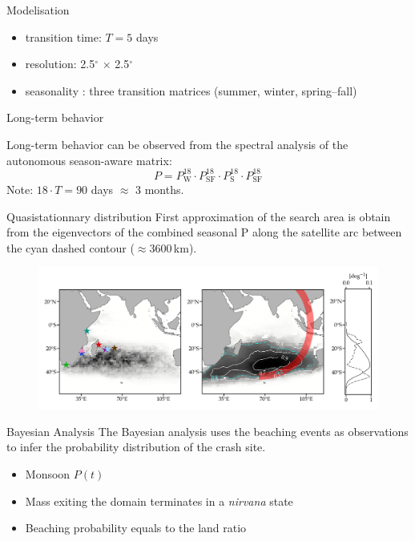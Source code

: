 \documentclass{beamer}
\begin{document}
\begin{frame}{Modelisation}

\begin{itemize}
  \item transition time: $T = 5$ days
  \item resolution: 2.5$^{\circ}$ $\times$ 2.5$^{\circ}$
  \item seasonality : three transition matrices (summer, winter, spring--fall)
\end{itemize}

\end{frame}



\begin{frame}{Long-term behavior}

Long-term behavior can be observed from the spectral analysis of the autonomous season-aware matrix:
\begin{equation*}
  P = P_\mathrm{W}^{18} \cdot P_\mathrm{SF}^{18} \cdot P_\mathrm{S}^{18}\cdot P_\mathrm{SF}^{18}
\end{equation*}
Note: $18 \cdot T = 90$ days $\approx$ 3 months.

\end{frame}

\begin{frame}{Quasistationnary distribution}
First approximation of the search area is obtain from the eigenvectors of the combined seasonal P along the satellite arc between the cyan dashed contour ($\approx 3600$\,km).

\begin{figure}[hbt]
  \includegraphics[width=\textwidth]{figures/mh370-fig02.png}
\end{figure}

\end{frame}

\begin{frame}{Bayesian Analysis}  
The Bayesian analysis uses the beaching events as observations to infer the probability distribution of the crash site.

\begin{itemize}
  \item Monsoon $P(t)$
  \item Mass exiting the domain terminates in a \textit{nirvana} state
  \item Beaching probability equals to the land ratio
\end{itemize}

\end{frame}
\end{document}
